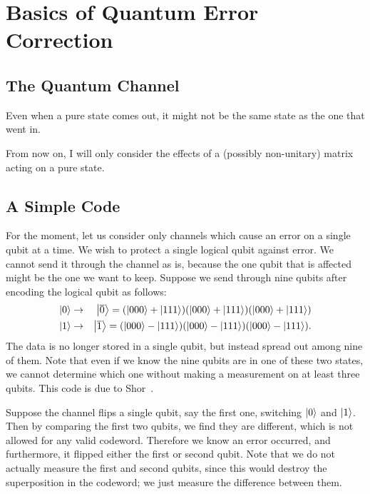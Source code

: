 \chapter{Basics of Quantum Error Correction}
\label{chap-basics}

\section{The Quantum Channel}

Even when a pure state comes out, it might not be the same state as the one that went in.

From now on, I will only consider the effects of a (possibly non-unitary) matrix acting on a pure state.

\section{A Simple Code}

For the moment, let us consider only channels which cause an error on a
single qubit at a time.  We wish to protect a single logical qubit against
error.  We cannot send it through the channel as is, because the one qubit
that is affected might be the one we want to keep.  Suppose we send through
nine qubits after encoding the logical qubit as follows:
\begin{eqnarray}
	\ket{0} & \rightarrow & \ket{\overline{0}} = (\ket{000} + \ket{111})
	(\ket{000} + \ket{111}) (\ket{000} + \ket{111}) \\
	\ket{1} & \rightarrow & \ket{\overline{1}} = (\ket{000} - \ket{111})
	(\ket{000} - \ket{111}) (\ket{000} - \ket{111}).
\end{eqnarray}
The data is no longer stored in a single qubit, but instead spread out
among nine of them.  Note that even if we know the nine qubits are in one
of these two states, we cannot determine which one without making a
measurement on at least three qubits.  This code is due to
Shor~\cite{shor-9qubit}.

Suppose the channel flips a single qubit, say the first one, switching
$\ket{0}$ and $\ket{1}$.  Then by comparing the first two qubits, we find
they are different, which is not allowed for any valid codeword.  Therefore
we know an error occurred, and furthermore, it flipped either the first or
second qubit.  Note that we do not actually measure the first and second
qubits, since this would destroy the superposition in the codeword; we just
measure the difference between them.

